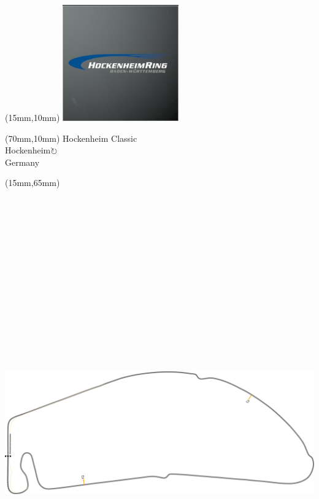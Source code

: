 \null\newpage
\begin{textblock*}{50mm}(15mm,10mm)%
\includegraphics[width=50mm]{LG/2015-05-20_00082.png}
\end{textblock*}
\begin{textblock*}{130mm}(70mm,10mm)%
{\fontsize{20}{20}\selectfont Hockenheim Classic\\}
{\fontsize{16}{16}\selectfont Hockenheim\hfill \Large$\circlearrowright$\\}
{\fontsize{12}{12}\selectfont Germany\\}
\end{textblock*}
\begin{textblock*}{185mm}(15mm,65mm)%
\centering
\mbox{\includegraphics[width=185mm,height=210mm,keepaspectratio]{PT/HOCL.pdf}}
\end{textblock*}
